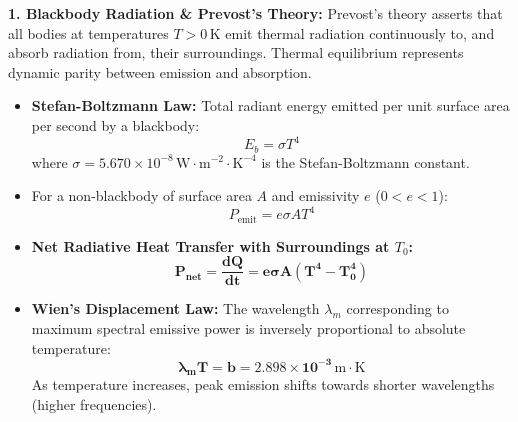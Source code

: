 \documentclass[10pt,a4paper]{article}
\begin{document}
\begin{conceptbox}
\textbf{1. Blackbody Radiation \& Prevost's Theory:}
Prevost's theory asserts that all bodies at temperatures $T > 0\,\mathrm{K}$ emit thermal radiation continuously to, and absorb radiation from, their surroundings. Thermal equilibrium represents dynamic parity between emission and absorption.
\begin{itemize}
  \item \textbf{Stefan-Boltzmann Law:} Total radiant energy emitted per unit surface area per second by a blackbody:
  \begin{equation}
    E_b = \sigma T^4
  \end{equation}
  where $\sigma = 5.670 \times 10^{-8}\,\mathrm{W}\cdot\mathrm{m}^{-2}\cdot\mathrm{K}^{-4}$ is the Stefan-Boltzmann constant.
  \item For a non-blackbody of surface area $A$ and emissivity $e$ ($0 < e < 1$):
  \begin{equation}
    P_{\text{emit}} = e \sigma A T^4
  \end{equation}
  \item \textbf{Net Radiative Heat Transfer with Surroundings at $T_0$:}
  \begin{equation}
    \mathbf{P_{\text{net}} = \frac{dQ}{dt} = e \sigma A (T^4 - T_0^4)}
  \end{equation}
  \item \textbf{Wien's Displacement Law:} The wavelength $\lambda_m$ corresponding to maximum spectral emissive power is inversely proportional to absolute temperature:
  \begin{equation}
    \mathbf{\lambda_m T = b = 2.898 \times 10^{-3}\,\mathrm{m}\cdot\mathrm{K}}
  \end{equation}
  As temperature increases, peak emission shifts towards shorter wavelengths (higher frequencies).
\end{itemize}
\end{conceptbox}
\end{document}
